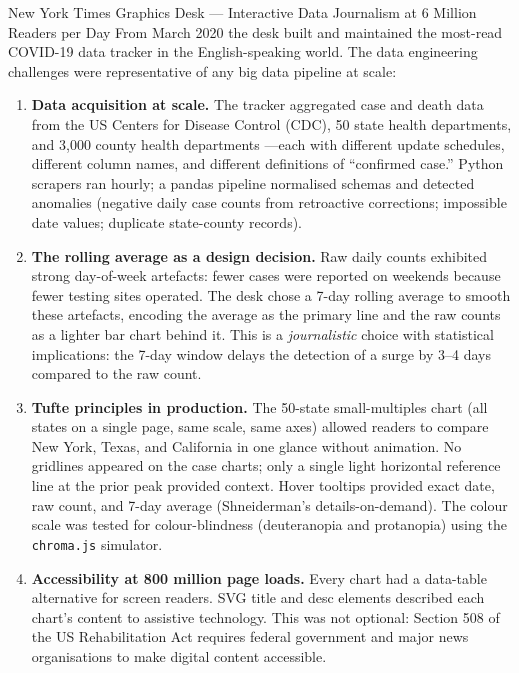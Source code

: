\begin{casestudy}{New York Times Graphics Desk --- Interactive Data
Journalism at 6 Million Readers per Day}
From March 2020 the desk built and maintained the most-read COVID-19
data tracker in the English-speaking world. The data engineering
challenges were representative of any big data pipeline at scale:

\begin{enumerate}
  \item \textbf{Data acquisition at scale.} The tracker aggregated case
        and death data from the US Centers for Disease Control (CDC),
        50 state health departments, and 3{,}000 county health departments
        ---each with different update schedules, different column names,
        and different definitions of ``confirmed case.'' Python scrapers
        ran hourly; a pandas pipeline normalised schemas and detected
        anomalies (negative daily case counts from retroactive
        corrections; impossible date values; duplicate state-county records).

  \item \textbf{The rolling average as a design decision.} Raw daily
        counts exhibited strong day-of-week artefacts: fewer cases were
        reported on weekends because fewer testing sites operated.
        The desk chose a 7-day rolling average to smooth these artefacts,
        encoding the average as the primary line and the raw counts as a
        lighter bar chart behind it. This is a \emph{journalistic} choice
        with statistical implications: the 7-day window delays the
        detection of a surge by 3--4 days compared to the raw count.

  \item \textbf{Tufte principles in production.} The 50-state
        small-multiples chart (all states on a single page, same scale,
        same axes) allowed readers to compare New York, Texas, and
        California in one glance without animation. No gridlines appeared
        on the case charts; only a single light horizontal reference line
        at the prior peak provided context. Hover tooltips provided
        exact date, raw count, and 7-day average (Shneiderman's
        details-on-demand). The colour scale was tested for
        colour-blindness (deuteranopia and protanopia) using the
        \texttt{chroma.js} simulator.

  \item \textbf{Accessibility at 800 million page loads.} Every chart
        had a data-table alternative for screen readers. SVG title
        and desc elements described each chart's content to assistive
        technology. This was not optional: Section 508 of the US
        Rehabilitation Act requires federal government and major news
        organisations to make digital content accessible.


\end{enumerate}
\end{casestudy}
